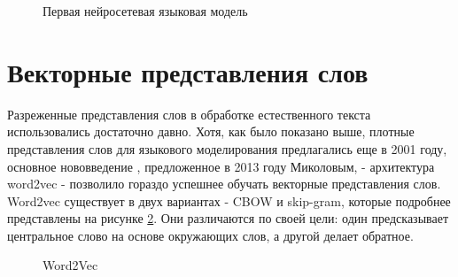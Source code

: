 \begin{figure}[ht]
  \caption{Первая нейросетевая языковая модель}\label{fig:Neuro1-Feedforward}
\end{figure}


\section{Векторные представления слов}
Разреженные представления слов в обработке естественного текста использовались достаточно давно. Хотя, как было показано выше, плотные представления слов для языкового моделирования предлагались еще в 2001 году, основное нововведение \cite{mikolov_2013}, предложенное в 2013 году Миколовым, - архитектура word2vec - позволило гораздо успешнее обучать векторные представления слов. Word2vec существует в двух вариантах - CBOW и skip-gram, которые подробнее представлены на рисунке \ref{fig:Neuro2-Word2Vec}. Они различаются по своей цели: один предсказывает центральное слово на основе окружающих слов, а другой делает обратное.


\begin{figure}[ht]
  \caption{Word2Vec}\label{fig:Neuro2-Word2Vec}
\end{figure}

